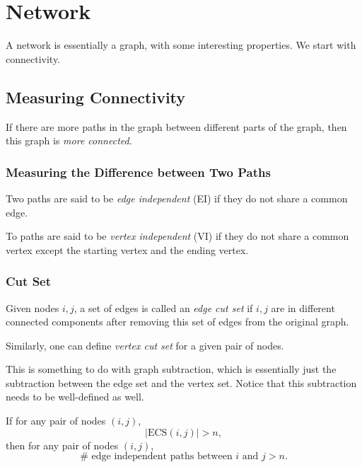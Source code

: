 \chapter{Network}
A network is essentially a graph, with some interesting properties. We start with connectivity.

\section{Measuring Connectivity}
\begin{intuition}
	If there are more paths in the graph between different parts of the graph, then this graph is \emph{more connected}.
\end{intuition}
\subsection{Measuring the Difference between Two Paths}
\begin{definition}
	Two paths are said to be \emph{edge independent} (EI) if they do not share a common edge.
\end{definition}

\begin{definition}
	To paths are said to be \emph{vertex independent} (VI) if they do not share a common vertex except the starting vertex and the ending vertex.
\end{definition}

\subsection{Cut Set}
\begin{definition}
	Given nodes \(i, j\), a set of edges is called an \emph{edge cut set} if \(i, j\) are in different connected components after removing this set of edges from the original
	graph.
\end{definition}
Similarly, one can define \emph{vertex cut set} for a given pair of nodes.

\begin{remark}
	This is something to do with graph subtraction, which is essentially just the subtraction between the edge set and the vertex set. Notice that this subtraction needs to be
	well-defined as well.
\end{remark}

\begin{theorem}
	If for any pair of nodes \((i, j)\),
	\[
		\left\vert \mathrm{ECS}(i, j) \right\vert > n,
	\]
	then for any pair of nodes \((i, j)\),
	\[
		\# \text{ edge independent paths between }i \text{ and }j > n.
	\]
\end{theorem}